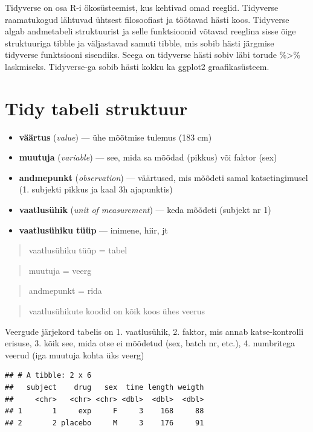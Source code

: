 \documentclass[]{book}
\providecommand{\tightlist}{%
  \setlength{\itemsep}{0pt}\setlength{\parskip}{0pt}}
\begin{document}
Tidyverse on osa R-i ökosüsteemist, kus kehtivad omad reeglid. Tidyverse
raamatukogud lähtuvad ühtsest filosoofiast ja töötavad hästi koos.
Tidyverse algab andmetabeli struktuurist ja selle funktsioonid võtavad
reeglina sisse õige struktuuriga tibble ja väljastavad samuti tibble,
mis sobib hästi järgmise tidyverse funktsiooni sisendiks. Seega on
tidyverse hästi sobiv läbi torude \%\textgreater{}\% laskmiseks.
Tidyverse-ga sobib hästi kokku ka ggplot2 graafikasüsteem.

\section{Tidy tabeli struktuur}\label{tidy-tabeli-struktuur}

\begin{itemize}
\tightlist
\item
  \textbf{väärtus} (\emph{value}) --- ühe mõõtmise tulemus (183 cm)
\item
  \textbf{muutuja} (\emph{variable}) --- see, mida sa mõõdad (pikkus)
  või faktor (sex)
\item
  \textbf{andmepunkt} (\emph{observation}) --- väärtused, mis mõõdeti
  samal katsetingimusel (1. subjekti pikkus ja kaal 3h ajapunktis)
\item
  \textbf{vaatlusühik} (\emph{unit of measurement}) --- keda mõõdeti
  (subjekt nr 1)
\item
  \textbf{vaatlusühiku tüüp} --- inimene, hiir, jt
\end{itemize}

\begin{quote}
vaatlusühiku tüüp = tabel
\end{quote}

\begin{quote}
muutuja = veerg
\end{quote}

\begin{quote}
andmepunkt = rida
\end{quote}

\begin{quote}
vaatlusühikute koodid on kõik koos ühes veerus
\end{quote}

Veergude järjekord tabelis on 1. vaatlusühik, 2. faktor, mis annab
katse-kontrolli erisuse, 3. kõik see, mida otse ei mõõdetud (sex, batch
nr, etc.), 4. numbritega veerud (iga muutuja kohta üks veerg)

\begin{verbatim}
## # A tibble: 2 x 6
##   subject    drug   sex  time length weigth
##     <chr>   <chr> <chr> <dbl>  <dbl>  <dbl>
## 1       1     exp     F     3    168     88
## 2       2 placebo     M     3    176     91
\end{verbatim}
\end{document}
